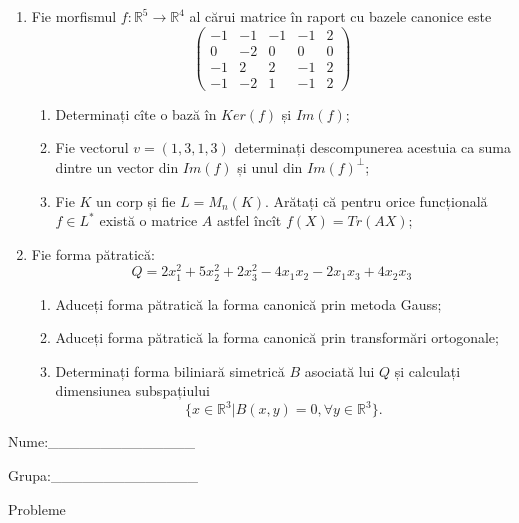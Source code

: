 \documentclass{article}
\begin{document}
\begin{enumerate}
 \item Fie morfismul $f:\mathbb{R}^5 \to \mathbb{R}^4$ al cărui matrice în raport cu bazele canonice este
$$\begin{pmatrix}
-1&-1&-1&-1&2\\
0&-2&0&0&0\\
-1&2&2&-1&2\\
-1&-2&1&-1&2
\end{pmatrix}$$

\begin{enumerate}
\item Determinați cîte o bază în $Ker(f)$ și $Im(f)$;
\item Fie vectorul $v=(1,3,1,3)$ determinați descompunerea acestuia ca suma dintre un vector din $Im(f)$ și unul din $Im(f)^\perp$;
\item Fie $K$ un corp și fie $L=M_n(K)$. Arătați că pentru orice funcțională $f \in L^*$ există o matrice $A$ astfel încît $f(X)=Tr(AX)$;
\end{enumerate}
\item Fie forma pătratică:
$$Q= 2x_1^2+5x_2^2+2x_3^2-4x_1x_2-2x_1x_3+4x_2x_3$$

\begin{enumerate}
\item Aduceți forma pătratică la forma canonică prin metoda Gauss;
\item Aduceți forma pătratică la forma canonică prin transformări ortogonale;
\item Determinați forma biliniară simetrică $B$ asociată lui $Q$ și calculați dimensiunea subspațiului
$$\{x \in \mathbb{R}^3 | B(x,y)=0,\forall y \in \mathbb{R}^3\}.$$

\end{enumerate}
\end{enumerate}
\newpage
\begin{flushright}
Nume:\_\_\_\_\_\_\_\_\_\_\_\_\_\_
 
 
Grupa:\_\_\_\_\_\_\_\_\_\_\_\_\_\_
\end{flushright}
\begin{center}
\vspace{2cm}
{\Large Probleme}
\vspace{2cm}
\end{center}
\end{document}
